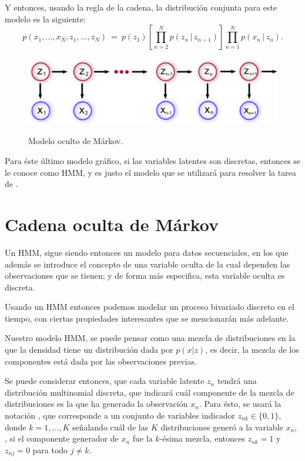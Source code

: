 Y entonces, usando la regla de la cadena, la distribución conjunta para este modelo es la siguiente: 
\begin{equation}
\label{eqn:2-7}
p(x_1, ..., x_N, z_1, ..., z_N) ~=~ 
        p(z_1) \left [ \prod_{n=2}^N p(z_n \,|\, z_{n-1}) \right ] 
\prod_{n=1}^N p(x_n \,|\, z_{n}).
\end{equation}

\begin{figure}[tp]
        \myfloatalign
        {\includegraphics[width=0.8\linewidth]{gfx/chap3/mod-hmm1}}
        \caption{Modelo oculto de Márkov.}
        \label{fig:mod_hmm1}
\end{figure}

Para éste último modelo gráfico, si las variables latentes son discretas, entonces se le conoce como \acf{HMM}, y es justo el modelo que se utilizará para resolver la tarea de \sd.

\section{Cadena oculta de Márkov}

Un \acl{HMM}, sigue siendo entonces un modelo para datos secuenciales, en los que además se introduce el concepto de una variable oculta de la cual dependen las observaciones que se tienen; y de forma más especifica, esta variable oculta es discreta. 

Usando un \ac{HMM} entonces podemos modelar un proceso bivariado discreto en el tiempo, con ciertas propiedades interesantes que se mencionarán más adelante.

Nuestro modelo \ac{HMM}, se puede pensar como una mezcla de distribuciones en la que la densidad tiene un distribución dada por $p(x|z)$, es decir, la mezcla de los componentes está dada por las observaciones previas.

Se puede considerar entonces, que cada variable latente $z_n$ tendrá una distribución multinomial discreta, que indicará cuál componente de la mezcla de distribuciones es la que ha generado la observación $x_n$. Para ésto, se usará la notación \unk, que corresponde a un conjunto de variables indicador $z_{nk} \in \lbrace 0, 1 \rbrace$, donde $k = 1, ..., K$ señalando cuál de las $K$ distribuciones generó a la variable $x_n$, \ie, si el componente generador de $x_n$ fue la $k$-ésima mezcla, entonces $z_{nk} = 1$ y $z_{nj} = 0$ para todo $j \neq k$.

